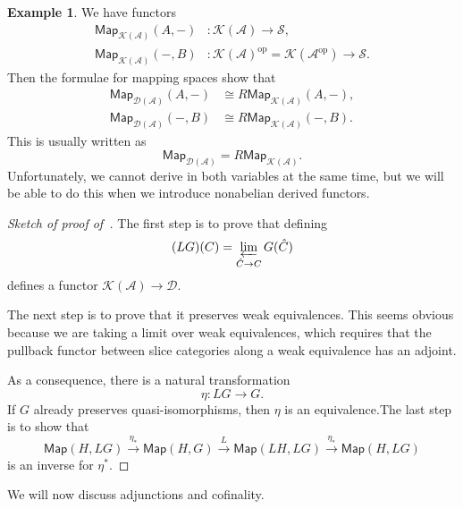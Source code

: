 \documentclass[10pt, oneside]{memoir}
\theoremstyle{definition}
\newtheorem{exm}[thm]{Example}
\theoremstyle{remark}
\theoremstyle{plain}
\theoremstyle{definition}
\theoremstyle{remark}
\newcommand{\mc}[1]{\mathcal{#1}}
\newcommand{\ms}[1]{\mathsf{#1}}
\newcommand{\1}{\mathbf{1}}
\newcommand{\2}{\mathbf{2}}
\newcommand{\3}{\mathbf{3}}
\DeclareMathOperator{\op}{op}
\begin{document}
\begin{exm}
    We have functors
    \begin{align*}
        \ms{Map}_{\mc{K}(\mc{A})}(A, -) &\colon \mc{K}(\mc{A}) \to \mc{S}, \\
        \ms{Map}_{\mc{K}(\mc{A})}(-, B) &\colon \mc{K}(\mc{A})^{\op} = \mc{K}(\mc{A}^{\op}) \to \mc{S}.
    \end{align*}
    Then the formulae for mapping spaces show that
    \begin{align*}
        \ms{Map}_{\mc{D}(\mc{A})}(A, -) &\cong R \ms{Map}_{\mc{K}(\mc{A})}(A, -), \\
        \ms{Map}_{\mc{D}(\mc{A})}(-, B) &\cong R \ms{Map}_{\mc{K}(\mc{A})}(-, B).
    \end{align*}
    This is usually written as
    \[ \ms{Map}_{\mc{D}(\mc{A})} = R\ms{Map}_{\mc{K}(\mc{A})}. \]
    Unfortunately, we cannot derive in both variables at the same time, but we will be able to do this when we introduce nonabelian derived functors.
\end{exm}

\begin{proof}[Sketch of proof of~]
    The first step is to prove that defining
    \[ (LG)(C) = \varprojlim_{\hat{C} \to C} G(\hat{C}) \]
    defines a functor $\mc{K}(\mc{A}) \to \mc{D}$.

    The next step is to prove that it preserves weak equivalences. This seems obvious because we are taking a limit over weak equivalences, which requires that the pullback functor between slice categories along a weak equivalence has an adjoint.

    As a consequence, there is a natural transformation
    \[ \eta \colon LG \to G. \]
    If $G$ already preserves quasi-isomorphisms, then $\eta$ is an equivalence.The last step is to show that
    \[ \ms{Map}(H, LG) \xrightarrow{\eta_*} \ms{Map}(H, G) \xrightarrow{L} \ms{Map}(LH, LG) \xrightarrow{\eta_*} \ms{Map}(H, LG) \]
    is an inverse for $\eta^*$.
\end{proof}

We will now discuss adjunctions and cofinality.
\end{document}
